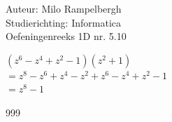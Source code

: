 \documentclass[a4paper]{article}
\begin{document}
\noindent \large Auteur: Milo Rampelbergh \\
\noindent \large Studierichting: Informatica\\
\noindent \large Oefeningenreeks 1D nr. 5.10\\

\medskip

\normalsize


$ (z^6-z^4+z^2-1)(z^2+1) $\\

$ = z^8-z^6+z^4-z^2+z^6-z^4+z^2-1 $\\

$ = z^8-1  $\\


\begin{thebibliography}{999}
\end{thebibliography}
\end{document}
